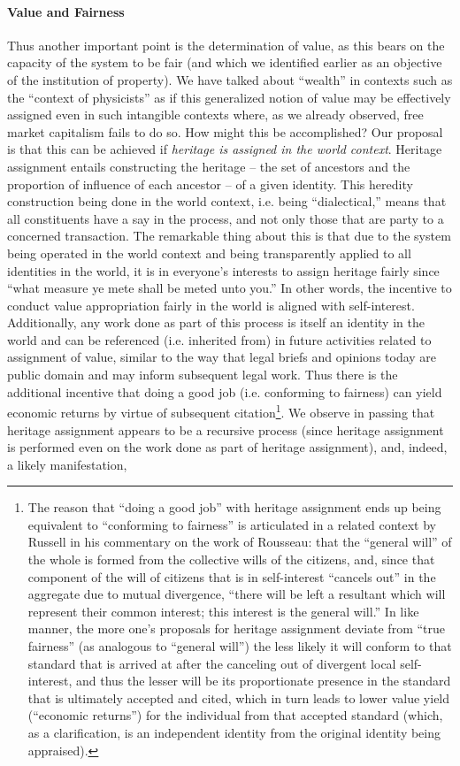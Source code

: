 \documentclass[pra,twocolumn,groupedaddress,10pt]{revtex4}
\theoremstyle{definition}
\begin{document}
\paragraph{Value and Fairness} Thus another important point is the determination of value, as this bears on the capacity of the system to be fair (and which we identified earlier as an objective of the institution of property). We have talked about ``wealth'' in contexts such as the ``context of physicists'' as if this generalized notion of value may be effectively assigned even in such intangible contexts where, as we already observed, free market capitalism fails to do so. How might this be accomplished? Our proposal is that this can be achieved if \textit{heritage is assigned in the world context}. Heritage assignment entails constructing the heritage -- the set of ancestors and the proportion of influence of each ancestor -- of a given identity. This heredity construction being done in the world context, i.e. being ``dialectical,'' means that all constituents have a say in the process, and not only those that are party to a concerned transaction. The remarkable thing about this is that due to the system being operated in the world context and being transparently applied to all identities in the world, it is in everyone's interests to assign heritage fairly since ``what measure ye mete shall be meted unto you.'' In other words, the incentive to conduct value appropriation fairly in the world is aligned with self-interest. Additionally, any work done as part of this process is itself an identity in the world and can be referenced (i.e. inherited from) in future activities related to assignment of value, similar to the way that legal briefs and opinions today are public domain and may inform subsequent legal work. Thus there is the additional incentive that doing a good job (i.e. conforming to fairness) can yield economic returns by virtue of subsequent citation\footnote{The reason that ``doing a good job'' with heritage assignment ends up being equivalent to ``conforming to fairness'' is articulated in a related context by Russell\cite{russell} in his commentary on the work of Rousseau\cite{rousseau}: that the ``general will'' of the whole is formed from the collective wills of the citizens, and, since that component of the will of citizens that is in self-interest ``cancels out'' in the aggregate due to mutual divergence, ``there will be left a resultant which will represent their common interest; this interest is the general will.'' In like manner, the more one's proposals for heritage assignment deviate from ``true fairness'' (as analogous to ``general will'') the less likely it will conform to that standard that is arrived at after the canceling out of divergent local self-interest, and thus the lesser will be its proportionate presence in the standard that is ultimately accepted and cited, which in turn leads to lower value yield (``economic returns'') for the individual from that accepted standard (which, as a clarification, is an independent identity from the original identity being appraised).}. We observe in passing that heritage assignment appears to be a recursive process (since heritage assignment is performed even on the work done as part of heritage assignment), and, indeed, a likely manifestation, 
\end{document}
